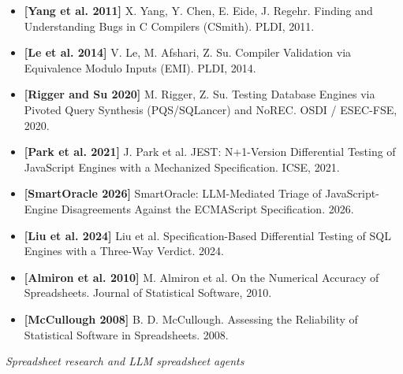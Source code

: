 \documentclass[
]{article}
\providecommand{\tightlist}{%
  \setlength{\itemsep}{0pt}\setlength{\parskip}{0pt}}
\begin{document}
\begin{itemize}
\tightlist
\item
  \textbf{{[}Yang et al. 2011{]}} X. Yang, Y. Chen, E. Eide, J. Regehr.
  Finding and Understanding Bugs in C Compilers (CSmith). PLDI, 2011.
\item
  \textbf{{[}Le et al. 2014{]}} V. Le, M. Afshari, Z. Su. Compiler
  Validation via Equivalence Modulo Inputs (EMI). PLDI, 2014.
\item
  \textbf{{[}Rigger and Su 2020{]}} M. Rigger, Z. Su. Testing Database
  Engines via Pivoted Query Synthesis (PQS/SQLancer) and NoREC. OSDI /
  ESEC-FSE, 2020.
\item
  \textbf{{[}Park et al. 2021{]}} J. Park et al. JEST: N+1-Version
  Differential Testing of JavaScript Engines with a Mechanized
  Specification. ICSE, 2021.
\item
  \textbf{{[}SmartOracle 2026{]}} SmartOracle: LLM-Mediated Triage of
  JavaScript-Engine Disagreements Against the ECMAScript Specification.
  2026.
\item
  \textbf{{[}Liu et al. 2024{]}} Liu et al. Specification-Based
  Differential Testing of SQL Engines with a Three-Way Verdict. 2024.
\item
  \textbf{{[}Almiron et al. 2010{]}} M. Almiron et al. On the Numerical
  Accuracy of Spreadsheets. Journal of Statistical Software, 2010.
\item
  \textbf{{[}McCullough 2008{]}} B. D. McCullough. Assessing the
  Reliability of Statistical Software in Spreadsheets. 2008.
\end{itemize}

\emph{Spreadsheet research and LLM spreadsheet agents}
\end{document}
